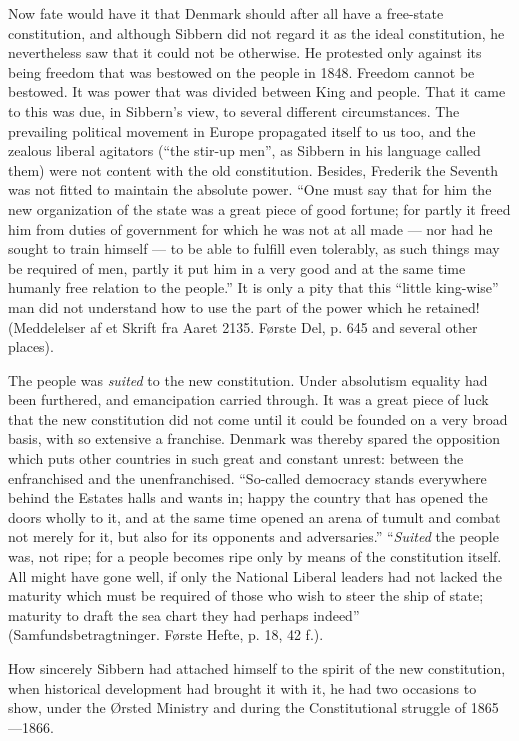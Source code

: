 \documentclass[12pt,a4paper,openany]{book}
\newcommand{\opage}[1]{\marginnote{\footnotesize\textit{[#1]}}}
\begin{document}
Now fate would have it that Denmark should after all have
a free-state constitution, and although Sibbern did not regard it
as the ideal constitution, he nevertheless saw that it could not
be otherwise. He protested only against its being
freedom that was bestowed on the people in 1848. Freedom cannot be
bestowed. It was power that was divided between King and
people. That it came to this was due, in Sibbern's view,
to several different circumstances. The prevailing political
movement in Europe propagated itself to us too, and the zealous
liberal agitators (``the stir-up men'', as Sibbern in his language
called them) were not content with the old constitution.
Besides, Frederik the Seventh was not fitted to maintain
the absolute power. ``One must say that for him the new
organization of the state was a great piece of good fortune; for partly it freed him from
duties of government for which he was not at all made --- nor
had he sought to train himself --- to be able to fulfill
even tolerably, as such things may be required of men, partly
it put him in a very good and at the same time humanly free
relation to the people.'' It is only a pity that this ``little
king-wise'' man did not understand how to use the part of the power
which he retained! (Meddelelser af et Skrift fra Aaret 2135.
Første Del, p. 645 and several other places).

The people was \emph{suited} to the new constitution. Under
absolutism equality had been furthered, and emancipation
carried through. It was a great piece of luck that the new
constitution %
 did not come until it could be founded on a
\opage{104}very broad basis, with so extensive a franchise. Denmark was
thereby spared the opposition which puts
other countries in such great and constant unrest: between the
enfranchised and the unenfranchised. ``So-called
democracy stands everywhere behind the Estates halls and wants in;
happy the country that has opened the doors wholly to it, and
at the same time opened an arena of tumult and combat not merely
for it, but also for its opponents and adversaries.''
``\emph{Suited} the people was, not ripe; for a people becomes ripe only
by means of the constitution itself. All might have gone
well, if only the National Liberal leaders had not
lacked the maturity which must be required of those who wish to
steer the ship of state; maturity to draft the sea chart they had
perhaps indeed'' (Samfundsbetragtninger. Første Hefte, p. 18, 42 f.).

How sincerely Sibbern had attached himself to the spirit of
the new constitution, when historical development had brought
it with it, he had two occasions to show, under the
Ørsted Ministry and during the Constitutional struggle of 1865---1866.
\end{document}
